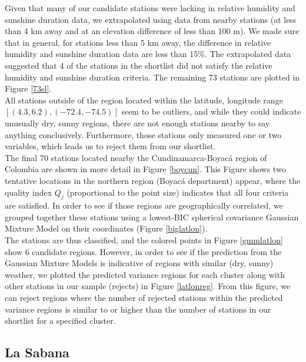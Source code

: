 \documentclass[12pt]{iopart}
\begin{document}
Given that many of our candidate stations were lacking in relative humidity and sunshine duration data, we extrapolated using data from nearby stations (at less than 4 km away and at an elevation difference of less than 100 m). We made sure that in general, for stations less than 5 km away, the difference in relative humidity and sunshine duration data are less than 15\%. The extrapolated data suggested that 4 of the stations in the shortlist did not satisfy the relative humidity and sunshine duration criteria.  The remaining 73 stations are plotted in Figure \ref{73sl}.\\

All stations outside of the region located within the latitude, longitude range $[(4.3,6.2),(-72.4,-74.5)]$ seem to be outliers, and while they could indicate unusually dry, sunny regions, there are not enough stations nearby to say anything conclusively. Furthermore, those stations only measured one or two variables, which leads us to reject them from our shortlist. \\

The final 70 stations located nearby the Cundinamarca-Boyac\'a region of Colombia are shown in more detail in Figure \ref{boycun}. This Figure shows two tentative locations in the northern region (Boyac\'a department) appear, where the quality index $Q_j$ (proportional to the point size) indicates that all four criteria are satisfied. In order to see if those regions are geographically correlated, we grouped together these stations using a lowest-BIC spherical covariance Gaussian Mixture Model on their coordinates (Figure \ref{biglatlon}).\\

The stations are thus classified, and the colored points in Figure \ref{gmmlatlon} show 6 candidate regions. However, in order to see if the prediction from the Gaussian Mixture Models is indicative of regions with similar (dry, sunny) weather, we plotted the predicted variance regions for each cluster along with other stations in our sample (rejects) in Figure \ref{latlonreg}. From this figure, we can reject regions where the number of rejected stations within the predicted variance regions is similar to or higher than the number of stations in our shortlist for a specified cluster.

\subsection{La Sabana}
\end{document}
